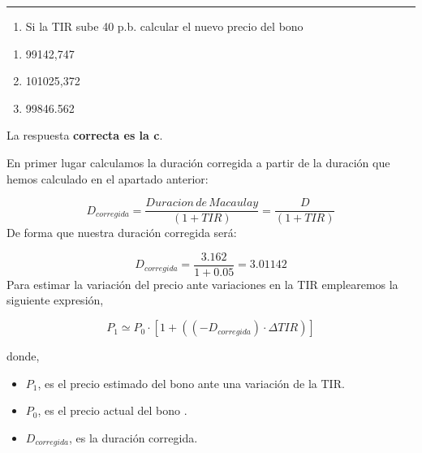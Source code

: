 \documentclass[
  letterpaper,
  DIV=11,
  numbers=noendperiod]{scrreprt}
\providecommand{\tightlist}{%
  \setlength{\itemsep}{0pt}\setlength{\parskip}{0pt}}\usepackage{longtable,booktabs,array}
\begin{document}
\begin{tcolorbox}
\begin{center}\rule{0.5\linewidth}{0.5pt}\end{center}

\begin{enumerate}
\def\labelenumi{\arabic{enumi}.}
\setcounter{enumi}{2}
\tightlist
\item
  Si la TIR sube 40 p.b. calcular el nuevo precio del bono
\end{enumerate}

\begin{enumerate}
\def\labelenumi{\alph{enumi}.}
\item
  99142,747
\item
  101025,372
\item
  99846.562
\end{enumerate}

\begin{tcolorbox}[enhanced jigsaw, toprule=.15mm, left=2mm, breakable, opacitybacktitle=0.6, toptitle=1mm, coltitle=black, arc=.35mm, leftrule=.75mm, bottomtitle=1mm, titlerule=0mm, title=\textcolor{quarto-callout-tip-color}{\faLightbulb}\hspace{0.5em}{Solución}, rightrule=.15mm, opacityback=0, bottomrule=.15mm, colback=white, colframe=quarto-callout-tip-color-frame, colbacktitle=quarto-callout-tip-color!10!white]

La respuesta \textbf{correcta es la c}.

En primer lugar calculamos la duración corregida a partir de la duración
que hemos calculado en el apartado anterior:

\[D_{corregida}=\frac{Duracion\,de\, Macaulay}{\left(1+TIR\right)}=\frac{D}{\left(1+TIR\right)} \]
De forma que nuestra duración corregida será:

\[D_{corregida}=\frac{3.162}{1+0.05}=3.01142\] Para estimar la variación
del precio ante variaciones en la TIR emplearemos la siguiente
expresión,

\[P_1\simeq P_0\cdot\left[1+((-D_{corregida})\cdot\Delta TIR)\right]\]

donde,

\begin{itemize}
\item
  \(P_1\), es el precio estimado del bono ante una variación de la TIR.
\item
  \(P_0\), es el precio actual del bono .
\item
  \(D_{corregida}\), es la duración corregida.
\end{itemize}


\end{tcolorbox}
\end{tcolorbox}
\end{document}
